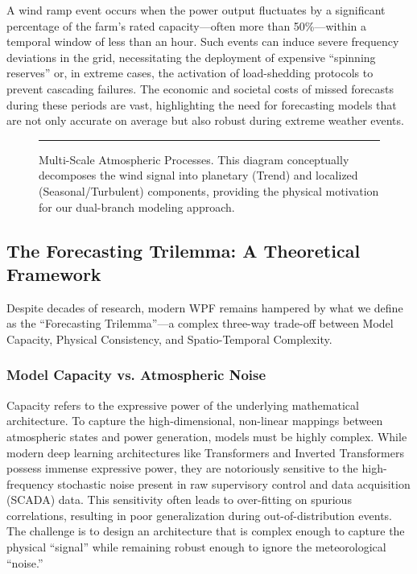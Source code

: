 A wind ramp event occurs when the power output fluctuates by a significant percentage of the farm's rated capacity---often more than 50\%---within a temporal window of less than an hour. Such events can induce severe frequency deviations in the grid, necessitating the deployment of expensive ``spinning reserves'' or, in extreme cases, the activation of load-shedding protocols to prevent cascading failures. The economic and societal costs of missed forecasts during these periods are vast, highlighting the need for forecasting models that are not only accurate on average but also robust during extreme weather events.

\begin{figure}[htbp]
\centering
\rule{0.48\textwidth}{0.35\textwidth}
\caption{Multi-Scale Atmospheric Processes. This diagram conceptually decomposes the wind signal into planetary (Trend) and localized (Seasonal/Turbulent) components, providing the physical motivation for our dual-branch modeling approach.}
\label{fig:atm_physics}
\end{figure}

\subsection{The Forecasting Trilemma: A Theoretical Framework}
\label{sec:trilemma}
Despite decades of research, modern WPF remains hampered by what we define as the ``Forecasting Trilemma''---a complex three-way trade-off between Model Capacity, Physical Consistency, and Spatio-Temporal Complexity. 

\subsubsection{Model Capacity vs. Atmospheric Noise}
\label{sec:capacity}
Capacity refers to the expressive power of the underlying mathematical architecture. To capture the high-dimensional, non-linear mappings between atmospheric states and power generation, models must be highly complex. While modern deep learning architectures like Transformers and Inverted Transformers possess immense expressive power, they are notoriously sensitive to the high-frequency stochastic noise present in raw supervisory control and data acquisition (SCADA) data. This sensitivity often leads to over-fitting on spurious correlations, resulting in poor generalization during out-of-distribution events. The challenge is to design an architecture that is complex enough to capture the physical ``signal'' while remaining robust enough to ignore the meteorological ``noise.''

